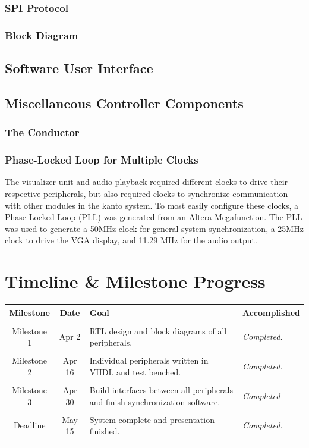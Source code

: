 \documentclass{article}
\begin{document}
	\subsubsection{SPI Protocol}
	\subsubsection{Block Diagram}
	


\subsection{Software User Interface}

\subsection{Miscellaneous Controller Components}
\subsubsection{The Conductor}
\subsubsection{Phase-Locked Loop for Multiple Clocks}

The visualizer unit and audio playback required different clocks to drive their 
respective peripherals, but also required clocks to synchronize communication 
with other modules in the kanto system. To most easily configure these clocks, 
a Phase-Locked Loop (PLL) was generated from an Altera Megafunction. The PLL 
was used to generate a 50MHz clock for general system synchronization, a 25MHz 
clock to drive the VGA display, and 11.29 MHz for the audio output. 

\section{Timeline \& Milestone Progress}
\begin{tabular}{cc|p{7cm}p{3cm}}
\textbf{Milestone} & \textbf{Date} & \textbf{Goal} & \textbf{Accomplished}\\ \hline
&&&\\
Milestone 1 & Apr 2 & RTL design and block diagrams of all peripherals.&
	\textit{Completed.}\\
&&&\\
Milestone 2 & Apr 16 & Individual peripherals written in VHDL and test benched.&
	\textit{Completed.}\\
&&&\\
Milestone 3 & Apr 30 & Build interfaces between all peripherals and finish synchronization software. &
	\textit{Completed}\\
&&&\\
Deadline&May 15&System complete and presentation finished.&\textit{Completed.}\\
&&&\\
\end{tabular}
\end{document}
